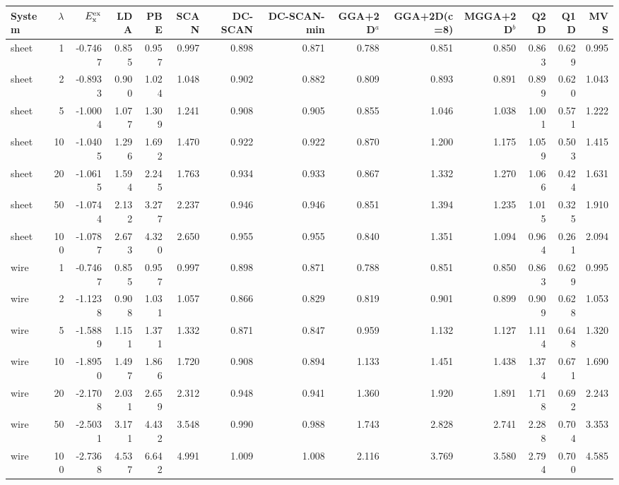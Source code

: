 \begin{tabular}{lrrrrrrrrrrrrr}
\toprule
System & $\lambda$ & $E_{\rm x}^{\rm ex}$ & LDA & PBE & SCAN & DC-SCAN & DC-SCAN-min & GGA+2D$^a$ & GGA+2D(c=8) & MGGA+2D$^b$ & Q2D & Q1D & MVS \\
\midrule
sheet & 1 & -0.7467 & 0.855 & 0.957 & 0.997 & 0.898 & 0.871 & 0.788 & 0.851 & 0.850 & 0.863 & 0.629 & 0.995 \\
sheet & 2 & -0.8933 & 0.900 & 1.024 & 1.048 & 0.902 & 0.882 & 0.809 & 0.893 & 0.891 & 0.899 & 0.620 & 1.043 \\
sheet & 5 & -1.0004 & 1.077 & 1.309 & 1.241 & 0.908 & 0.905 & 0.855 & 1.046 & 1.038 & 1.001 & 0.571 & 1.222 \\
sheet & 10 & -1.0405 & 1.296 & 1.692 & 1.470 & 0.922 & 0.922 & 0.870 & 1.200 & 1.175 & 1.059 & 0.503 & 1.415 \\
sheet & 20 & -1.0615 & 1.594 & 2.245 & 1.763 & 0.934 & 0.933 & 0.867 & 1.332 & 1.270 & 1.066 & 0.424 & 1.631 \\
sheet & 50 & -1.0744 & 2.132 & 3.277 & 2.237 & 0.946 & 0.946 & 0.851 & 1.394 & 1.235 & 1.015 & 0.325 & 1.910 \\
sheet & 100 & -1.0787 & 2.673 & 4.320 & 2.650 & 0.955 & 0.955 & 0.840 & 1.351 & 1.094 & 0.964 & 0.261 & 2.094 \\
\midrule
wire & 1 & -0.7467 & 0.855 & 0.957 & 0.997 & 0.898 & 0.871 & 0.788 & 0.851 & 0.850 & 0.863 & 0.629 & 0.995 \\
wire & 2 & -1.1238 & 0.908 & 1.031 & 1.057 & 0.866 & 0.829 & 0.819 & 0.901 & 0.899 & 0.909 & 0.628 & 1.053 \\
wire & 5 & -1.5889 & 1.151 & 1.371 & 1.332 & 0.871 & 0.847 & 0.959 & 1.132 & 1.127 & 1.114 & 0.648 & 1.320 \\
wire & 10 & -1.8950 & 1.497 & 1.866 & 1.720 & 0.908 & 0.894 & 1.133 & 1.451 & 1.438 & 1.374 & 0.671 & 1.690 \\
wire & 20 & -2.1708 & 2.031 & 2.659 & 2.312 & 0.948 & 0.941 & 1.360 & 1.920 & 1.891 & 1.718 & 0.692 & 2.243 \\
wire & 50 & -2.5031 & 3.171 & 4.432 & 3.548 & 0.990 & 0.988 & 1.743 & 2.828 & 2.741 & 2.288 & 0.704 & 3.353 \\
wire & 100 & -2.7368 & 4.537 & 6.642 & 4.991 & 1.009 & 1.008 & 2.116 & 3.769 & 3.580 & 2.794 & 0.700 & 4.585 \\
\bottomrule
\end{tabular}
